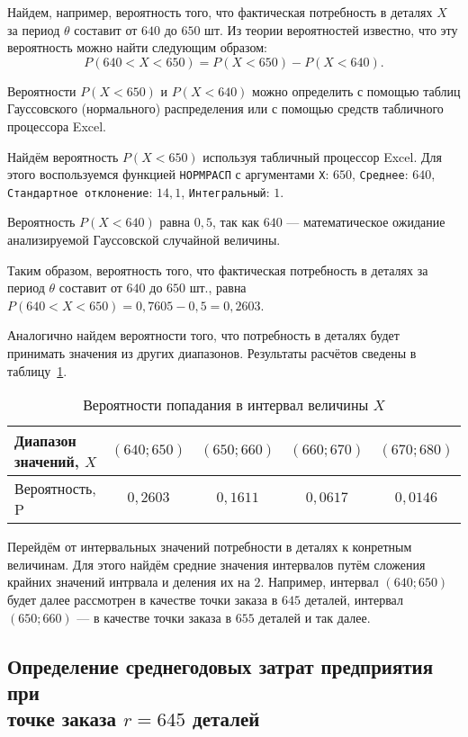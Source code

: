 Найдем, например, вероятность того, что фактическая потребность в деталях $X$
за период $\theta$ составит от $640$ до $650$ шт.
Из теории вероятностей известно, что эту вероятность можно найти следующим образом:
\[
	P(640<X<650) = P(X<650) - P(X<640).
\]

Вероятности $P(X<650)$ и $P(X<640)$ можно определить с помощью таблиц
Гауссовского (нормального) распределения или с помощью средств табличного процессора Excel.

Найдём вероятность $P(X<650)$ используя табличный процессор Excel. Для этого воспользуемся функцией
\texttt{НОРМРАСП} с аргументами \texttt{X}: $650$, \texttt{Среднее}: $640$,
\texttt{Стандартное отклонение}: $14{,}1$, \texttt{Интегральный}: $1$.

Вероятность $P(X<640)$ равна $0{,}5$, так как $640$ --- математическое ожидание
анализируемой Гауссовской случайной величины. 

Таким образом, вероятность того, что фактическая потребность в деталях за
период $\theta$ составит от $640$ до $650$ шт.,
равна $P(640<X<650) = 0{,}7605 - 0{,}5 = 0{,}2603$.

Аналогично найдем вероятности того, что потребность в деталях
будет принимать значения из других диапазонов. Результаты расчётов
сведены в таблицу~\ref{tbl:p}.

\begin{table} [h!]
  \caption{Вероятности попадания в интервал величины $X$}
  \label{tbl:p}
  \begin{tabular}{| m{6cm} | c | c | c | c |}
    \hline

    Диапазон значений, $X$ & $(640;650)$ & $(650;660)$ & $(660;670)$ & $(670;680)$ \\ \hline

   	Вероятность, P & $0{,}2603$ & $0{,}1611$ & $0{,}0617$ & $0{,}0146$ \\ \hline
      
  \end{tabular}
\end{table}


Перейдём от интервальных значений потребности в деталях к конретным величинам.
Для этого найдём средние значения интервалов путём сложения крайних
значений интрвала и деления их на $2$. Например, интервал $(640;650)$
будет далее рассмотрен в качестве точки заказа в $645$ деталей,
интервал $(650;660)$ --- в качестве точки заказа в $655$ деталей и так далее.

\newpage

\subsection{Определение среднегодовых затрат предприятия при \\ точке заказа $r = 645$ деталей}

